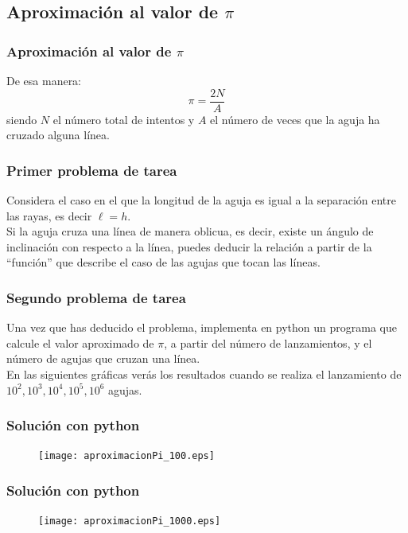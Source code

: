 \subsection{Aproximación al valor de $\pi$}
\begin{frame}
\frametitle{Aproximación al valor de $\pi$}
De esa manera: 
\[  \pi = \dfrac {2N}{A} \]
siendo $N$ el número total de intentos y $A$ el número de veces que la aguja ha cruzado alguna línea.
\end{frame}
\begin{frame}
\frametitle{Primer problema de tarea}
Considera el caso en el que la longitud de la aguja es igual a la separación entre las rayas, es decir $\ell = h$.
\\
\bigskip
Si la aguja cruza una línea de manera oblicua, es decir, existe un ángulo de inclinación con respecto a la línea, puedes deducir la relación a partir de la \enquote{función} que describe el caso de las agujas que tocan las líneas.
\end{frame}
\begin{frame}
\frametitle{Segundo problema de tarea}
Una vez que has deducido el problema, implementa en python un programa que calcule el valor aproximado de $\pi$, a partir del número de lanzamientos, y el número de agujas que cruzan una línea.
\\
\bigskip
En las siguientes gráficas verás los resultados cuando se realiza el lanzamiento de $10^{2}, 10^{3}, 10^{4}, 10^{5}, 10^{6}$ agujas.
\end{frame}
\begin{frame}
\frametitle{Solución con python}
\begin{figure}
  \centering
  \texttt{[image: aproximacionPi\_100.eps]}
\end{figure}
\end{frame}
\begin{frame}
\frametitle{Solución con python}
\begin{figure}
  \centering
  \texttt{[image: aproximacionPi\_1000.eps]}
\end{figure}
\end{frame}
